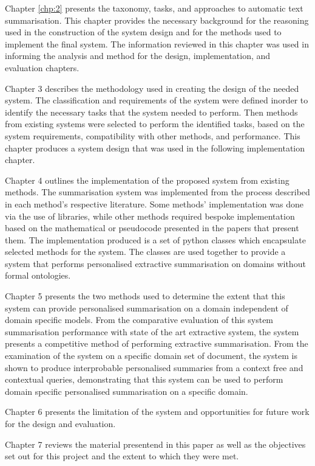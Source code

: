 Chapter \ref{chp:2} presents the taxonomy, tasks, and approaches to automatic text summarisation. This chapter provides the necessary background for the reasoning used in the construction of the system design and for the methods used to implement the final system. The information reviewed in this chapter was used in informing the analysis and method for the design, implementation, and evaluation chapters.

Chapter 3 describes the methodology used in creating the design of the needed system. The classification and requirements of the system were defined inorder to identify the necessary tasks that the system needed to perform. Then methods from existing systems were selected to perform the identified tasks, based on the system requirements, compatibility with other methods, and performance. This chapter produces a system design that was used in the following implementation chapter.

Chapter 4 outlines the implementation of the proposed system from existing methods. The summarisation system was implemented from the process described in each method's respective literature. Some methods’ implementation was done via the use of libraries, while other methods required bespoke implementation based on the mathematical or pseudocode presented in the papers that present them. The implementation produced is a set of python classes which encapsulate selected methods for the system. The classes are used together to provide a system that performs personalised extractive summarisation  on domains without formal ontologies.

Chapter 5 presents the two methods used to determine the extent that this system can provide personalised summarisation on a domain independent of domain specific models. From the comparative evaluation of this system summarisation performance with state of the art extractive system, the system presents a competitive method of performing extractive summarisation. From the examination of the system on a specific domain set of document, the system is shown to produce interprobable personalised summaries from a context free and contextual queries, demonstrating that this system can be used to perform domain specific personalised summarisation on a specific domain.

Chapter 6 presents the limitation of the system and opportunities for future work for the design and evaluation.

Chapter 7 reviews the material presentend in this paper as well as the objectives set out for this project and the extent to which they were met. 

\RaggedRight